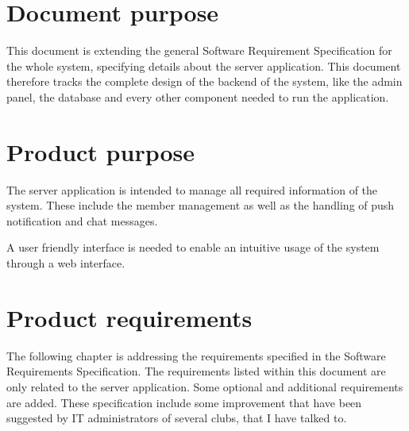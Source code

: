 \pagestyle{fancy}
\lhead{}
\renewcommand{\headrulewidth}{0pt}
\setlength{\headheight}{14pt}

\chapter{Document purpose}
This document is extending the general Software Requirement Specification for the whole system, specifying details about the server application. This document therefore tracks the complete design of the backend of the system, like the admin panel, the database and every other component needed to run the application.

\chapter{Product purpose}
The server application is intended to manage all required information of the system. These include the member management as well as the handling of push notification and chat messages.

A user friendly interface is needed to enable an intuitive usage of the system through a web interface.

\chapter{Product requirements}
The following chapter is addressing the requirements specified in the Software Requirements Specification. The requirements listed within this document are only related to the server application. Some optional and additional requirements are added. These specification include some improvement that have been suggested by IT administrators of several clubs, that I have talked to.

